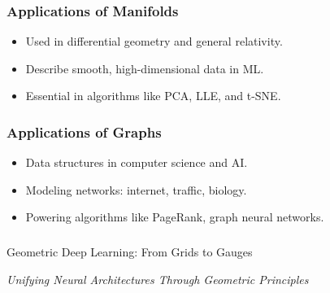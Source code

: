 \begin{frame}[fragile]\frametitle{Applications of Manifolds}
    \begin{itemize}
        \item Used in differential geometry and general relativity.
        \item Describe smooth, high-dimensional data in ML.
        \item Essential in algorithms like PCA, LLE, and t-SNE.
    \end{itemize}
\end{frame}

\begin{frame}[fragile]\frametitle{Applications of Graphs}
    \begin{itemize}
        \item Data structures in computer science and AI.
        \item Modeling networks: internet, traffic, biology.
        \item Powering algorithms like PageRank, graph neural networks.
    \end{itemize}
\end{frame}


\begin{frame}[fragile]\frametitle{}
\begin{center}
{\Large Geometric Deep Learning: From Grids to Gauges}
\vspace{0.5cm}

{\em Unifying Neural Architectures Through Geometric Principles}
\end{center}
\end{frame}

